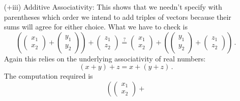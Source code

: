 {\begin{enumerate}
This again relies on the underlying real numbers which for any $x,y\in {\mathbb R}$ obey 
$$x+y=y+x\, .$$
This fact underlies the middle step of the following computation
$$
\begin{pmatrix}x_1\\x_2\end{pmatrix}+
\begin{pmatrix}y_1\\y_2\end{pmatrix}
=
\begin{pmatrix}x_1+y_1\\x_2+y_2\end{pmatrix}
=
\begin{pmatrix}y_1+x_1\\y_2+x_2\end{pmatrix}
=
\begin{pmatrix}y_1\\y_2\end{pmatrix}+
\begin{pmatrix}x_1\\x_2\end{pmatrix}\, ,$$
which demonstrates what we wished to show.
\item[(+iii)] Additive Associativity:
This shows that we needn't specify with parentheses which 
order we intend to add triples of vectors because their sums 
will agree for either choice. What we have to check is
$$
\left(\begin{pmatrix}x_1\\x_2\end{pmatrix}+
\begin{pmatrix}y_1\\y_2\end{pmatrix}\right)+
\begin{pmatrix}z_1\\z_2\end{pmatrix}
\stackrel?=
\begin{pmatrix}x_1\\x_2\end{pmatrix}+
\left(\begin{pmatrix}y_1\\y_2\end{pmatrix}+
\begin{pmatrix}z_1\\z_2\end{pmatrix}\right)\, .$$
Again this relies on the underlying associativity of real numbers:
$$
(x+y)+z=x+(y+z)\, .
$$
The computation required is
$$
\left(\begin{pmatrix}x_1\\x_2\end{pmatrix}+
$$
\end{enumerate}}
